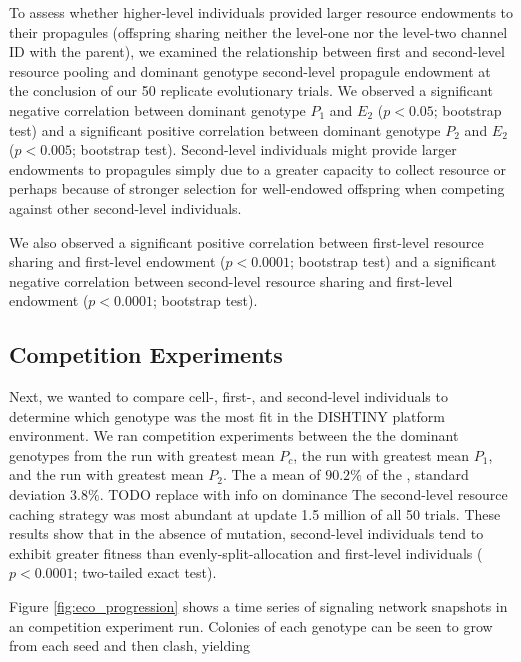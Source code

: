 To assess whether higher-level individuals provided larger resource endowments to their propagules (offspring sharing neither the level-one nor the level-two channel ID with the parent), we examined the relationship between first and second-level resource pooling and dominant genotype second-level propagule endowment at the conclusion of our 50 replicate evolutionary trials.
We observed a significant negative correlation between dominant genotype $P_1$ and $E_2$ ($p < 0.05$; bootstrap test) and a significant positive correlation between dominant genotype $P_2$ and $E_2$ ($p <  0.005$; bootstrap test).
Second-level individuals might provide larger endowments to propagules simply due to a greater capacity to collect resource or perhaps because of stronger selection for well-endowed offspring when competing against other second-level individuals.

We also observed a significant positive correlation between first-level resource sharing and first-level endowment ($p < 0.0001$; bootstrap test) and a significant negative correlation between second-level resource sharing and first-level endowment ($p < 0.0001$; bootstrap test).

\subsection{Competition Experiments}





Next, we wanted to compare cell-, first-, and second-level individuals to determine which genotype was the most fit in the DISHTINY platform environment.
We ran competition experiments between the the dominant genotypes from the run with greatest mean $P_{c}$, the run with greatest mean $P_1$, and the run with greatest mean $P_2$.
The a mean of $90.2 \%$ of the , standard deviation $3.8 \%$.
TODO replace with info on dominance
The second-level resource caching strategy was most abundant at update 1.5 million of all 50 trials.
These results show that in the absence of mutation, second-level individuals tend to exhibit greater fitness than evenly-split-allocation and first-level individuals ($p < 0.0001$; two-tailed exact test).

Figure \ref{fig:eco_progression} shows a time series of signaling network snapshots in an competition experiment run.
Colonies of each genotype can be seen to grow from each seed and then clash, yielding

